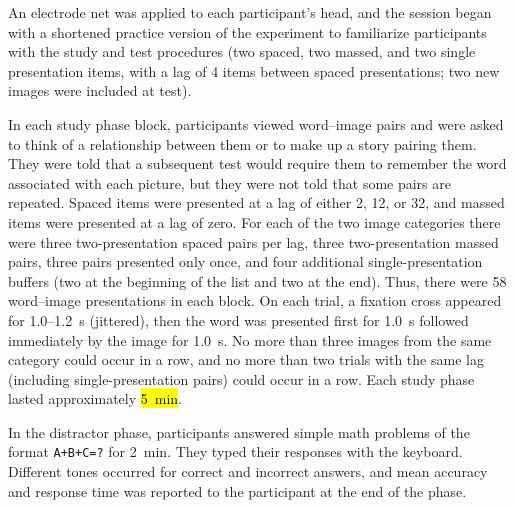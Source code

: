 An electrode net was applied to each participant's head, and the session began with a shortened practice version of the experiment to familiarize participants with the study and test procedures (two spaced, two massed, and two single presentation items, with a lag of 4 items between spaced presentations; two new images were included at test).



In each study phase block, participants viewed word--image pairs and were asked to think of a relationship between them or to make up a story pairing them.  They were told that a subsequent test would require them to remember the word associated with each picture, but they were not told that some pairs are repeated.  Spaced items were presented at a lag of either 2, 12, or 32, and massed items were presented at a lag of zero.  For each of the two image categories there were three two-presentation spaced pairs per lag, three two-presentation massed pairs, three pairs presented only once, and four additional single-presentation buffers (two at the beginning of the list and two at the end).
Thus, there were 58 word--image presentations in each block.  On each trial, a fixation cross appeared for 1.0--1.2~s (jittered), then the word was presented first for 1.0~s followed immediately by the image for 1.0~s.  No more than three images from the same category could occur in a row, and no more than two trials with the same lag (including single-presentation pairs) could occur in a row.  Each study phase lasted approximately \hl{5~min}.

In the distractor phase, participants answered simple math problems of the format \texttt{A+B+C=?} for 2~min.  They typed their responses with the keyboard.  Different tones occurred for correct and incorrect answers, and mean accuracy and response time was reported to the participant at the end of the phase.

